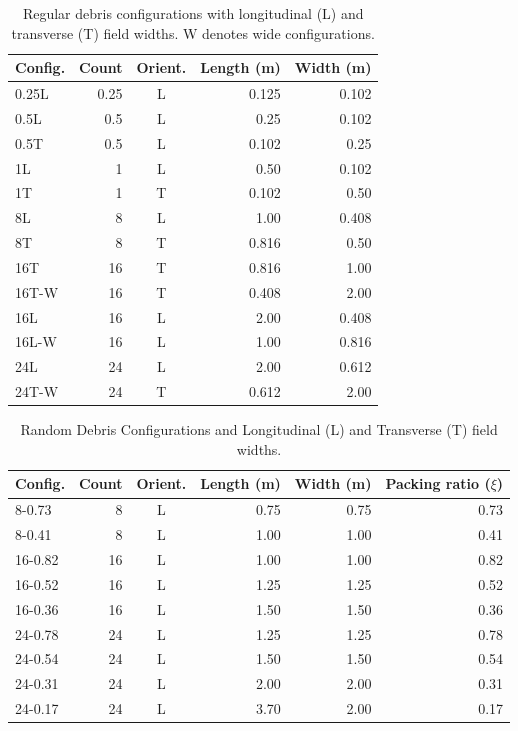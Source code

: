 \documentclass{article}
\begin{document}
{\begin{table}[h!]
\centering
\caption{Regular debris configurations with longitudinal (L) and transverse (T) field widths. W denotes wide configurations.}
\small
\begin{tabular}{l r c r r}
\hline
\textbf{Config.} & \textbf{Count} & \textbf{Orient.} & \textbf{Length (m)} & \textbf{Width (m)} \\
\hline
0.25L & 0.25  & L & 0.125 & 0.102 \\
0.5L & 0.5  & L & 0.25 & 0.102 \\
0.5T & 0.5  & L &  0.102 & 0.25 \\
1L & 1  & L & 0.50 & 0.102 \\
1T & 1  & T & 0.102 & 0.50 \\
8L & 8  & L & 1.00 & 0.408 \\
8T & 8  & T & 0.816 & 0.50 \\
16T & 16 & T & 0.816 & 1.00 \\
16T-W & 16 & T & 0.408 & 2.00 \\
16L & 16 & L & 2.00 & 0.408 \\
16L-W & 16 & L & 1.00 & 0.816 \\
24L & 24 & L & 2.00 & 0.612 \\
24T-W & 24 & T & 0.612 & 2.00 \\
\hline
\end{tabular}
\label{tab:debris-configurations-compact}
\end{table}

\begin{table}[h!]
\centering
\caption{Random Debris Configurations and Longitudinal (L) and Transverse (T) field widths.}
\small
\begin{tabular}{l r c r r r}
\hline
\textbf{Config.} & \textbf{Count} & \textbf{Orient.} & \textbf{Length (m)} & \textbf{Width (m)} & \textbf{Packing ratio ($\xi$)} \\
\hline
8-0.73 & 8  & L & 0.75 & 0.75 & 0.73 \\
8-0.41 & 8  & L & 1.00 & 1.00 & 0.41 \\
16-0.82 & 16 & L & 1.00 & 1.00 & 0.82 \\
16-0.52 & 16 & L & 1.25 & 1.25 & 0.52 \\
16-0.36 & 16 & L & 1.50 & 1.50 & 0.36 \\
24-0.78 & 24 & L & 1.25 & 1.25 & 0.78 \\
24-0.54 & 24 & L & 1.50 & 1.50 & 0.54 \\
24-0.31 & 24 & L & 2.00 & 2.00 & 0.31 \\
24-0.17 & 24 & L & 3.70 & 2.00 & 0.17 \\
\hline
\end{tabular}
\label{tab:random-debris-compact}
\end{table}

}
\end{document}
